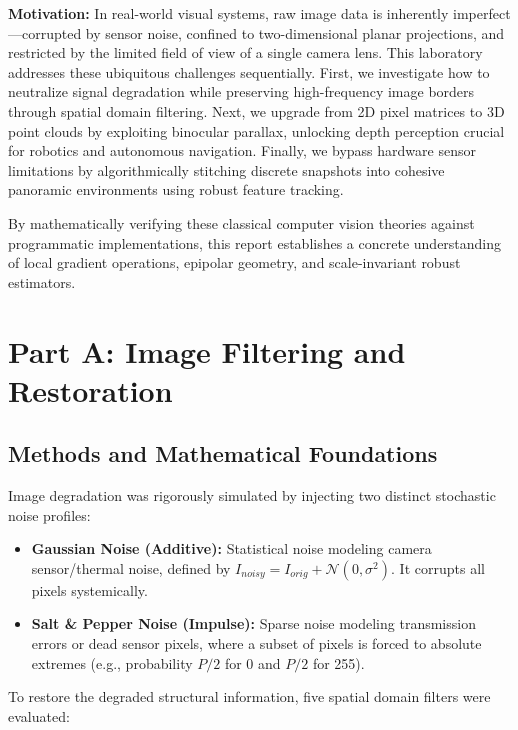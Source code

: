 \documentclass[a4paper,12pt]{article}
\begin{document}
\textbf{Motivation:}
In real-world visual systems, raw image data is inherently imperfect---corrupted by sensor noise, confined to two-dimensional planar projections, and restricted by the limited field of view of a single camera lens. This laboratory addresses these ubiquitous challenges sequentially. First, we investigate how to neutralize signal degradation while preserving high-frequency image borders through spatial domain filtering. Next, we upgrade from 2D pixel matrices to 3D point clouds by exploiting binocular parallax, unlocking depth perception crucial for robotics and autonomous navigation. Finally, we bypass hardware sensor limitations by algorithmically stitching discrete snapshots into cohesive panoramic environments using robust feature tracking.

By mathematically verifying these classical computer vision theories against programmatic implementations, this report establishes a concrete understanding of local gradient operations, epipolar geometry, and scale-invariant robust estimators.

\section{Part A: Image Filtering and Restoration}

\subsection{Methods and Mathematical Foundations}

Image degradation was rigorously simulated by injecting two distinct stochastic noise profiles:

\begin{itemize}
    \item \textbf{Gaussian Noise (Additive):} Statistical noise modeling camera sensor/thermal noise, defined by $I_{noisy} = I_{orig} + \mathcal{N}(0, \sigma^2)$. It corrupts all pixels systemically.
    \item \textbf{Salt \& Pepper Noise (Impulse):} Sparse noise modeling transmission errors or dead sensor pixels, where a subset of pixels is forced to absolute extremes (e.g., probability $P/2$ for 0 and $P/2$ for 255).
\end{itemize}

To restore the degraded structural information, five spatial domain filters were evaluated:
\end{document}
